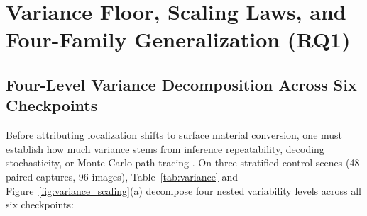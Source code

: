 \section{Variance Floor, Scaling Laws, and Four-Family Generalization (\textbf{RQ1})}
\label{sec:grounding}

\subsection{Four-Level Variance Decomposition Across Six Checkpoints}
\label{sec:variance}

Before attributing localization shifts to surface material conversion, one must establish how much variance stems from inference repeatability, decoding stochasticity, or Monte Carlo path tracing \citep{Zhao2021Calibrate}. On three stratified control scenes (48 paired captures, 96 images), Table~\ref{tab:variance} and Figure~\ref{fig:variance_scaling}(a) decompose four nested variability levels across all six checkpoints:

